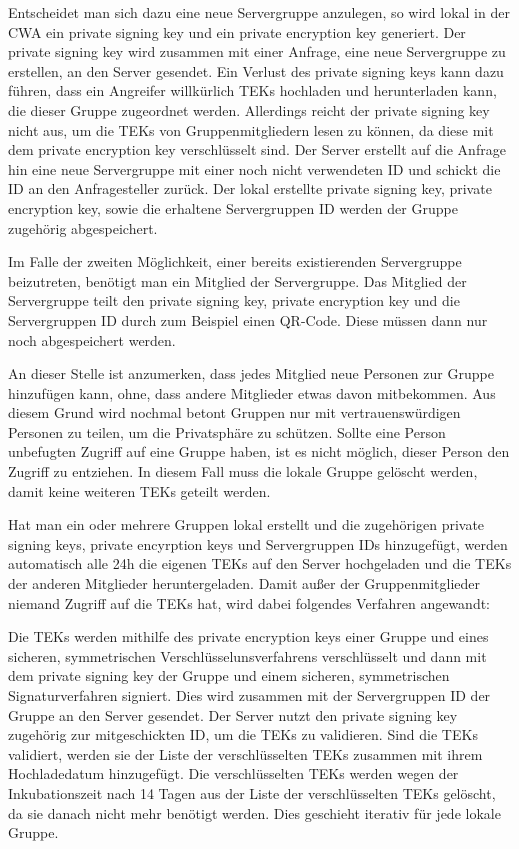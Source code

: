 \documentclass[conference]{IEEEtran}
\begin{document}
Entscheidet man sich dazu eine neue Servergruppe anzulegen, so wird lokal in der CWA ein private signing key und ein private encryption key generiert.
Der private signing key wird zusammen mit einer Anfrage, eine neue Servergruppe zu erstellen, an den Server gesendet.
Ein Verlust des private signing keys kann dazu führen, dass ein Angreifer willkürlich TEKs hochladen und herunterladen kann, die dieser Gruppe zugeordnet werden.
Allerdings reicht der private signing key nicht aus, um die TEKs von Gruppenmitgliedern lesen zu können, da diese mit dem private encryption key verschlüsselt sind.
Der Server erstellt auf die Anfrage hin eine neue Servergruppe mit einer noch nicht verwendeten ID und schickt die ID an den Anfragesteller zurück.
Der lokal erstellte private signing key, private encryption key, sowie die erhaltene Servergruppen ID werden der Gruppe zugehörig abgespeichert.

Im Falle der zweiten Möglichkeit, einer bereits existierenden Servergruppe beizutreten, benötigt man ein Mitglied der Servergruppe.
Das Mitglied der Servergruppe teilt den private signing key, private encryption key und die Servergruppen ID durch zum Beispiel einen QR-Code.
Diese müssen dann nur noch abgespeichert werden.

An dieser Stelle ist anzumerken, dass jedes Mitglied neue Personen zur Gruppe hinzufügen kann, ohne, dass andere Mitglieder etwas davon mitbekommen.
Aus diesem Grund wird nochmal betont Gruppen nur mit vertrauenswürdigen Personen zu teilen, um die Privatsphäre zu schützen.
Sollte eine Person unbefugten Zugriff auf eine Gruppe haben, ist es nicht möglich, dieser Person den Zugriff zu entziehen.
In diesem Fall muss die lokale Gruppe gelöscht werden, damit keine weiteren TEKs geteilt werden.

Hat man ein oder mehrere Gruppen lokal erstellt und die zugehörigen private signing keys, private encyrption keys und Servergruppen IDs hinzugefügt, werden automatisch alle 24h die eigenen TEKs auf den Server hochgeladen und die TEKs der anderen Mitglieder heruntergeladen.
Damit außer der Gruppenmitglieder niemand Zugriff auf die TEKs hat, wird dabei folgendes Verfahren angewandt:

Die TEKs werden mithilfe des private encryption keys einer Gruppe und eines sicheren, symmetrischen Verschlüsselunsverfahrens verschlüsselt und dann mit dem private signing key der Gruppe und einem sicheren, symmetrischen Signaturverfahren signiert.
Dies wird zusammen mit der Servergruppen ID der Gruppe an den Server gesendet.
Der Server nutzt den private signing key zugehörig zur mitgeschickten ID, um die TEKs zu validieren.
Sind die TEKs validiert, werden sie der Liste der verschlüsselten TEKs zusammen mit ihrem Hochladedatum hinzugefügt.
Die verschlüsselten TEKs werden wegen der Inkubationszeit nach 14 Tagen aus der Liste der verschlüsselten TEKs gelöscht, da sie danach nicht mehr benötigt werden.
Dies geschieht iterativ für jede lokale Gruppe.
\end{document}
